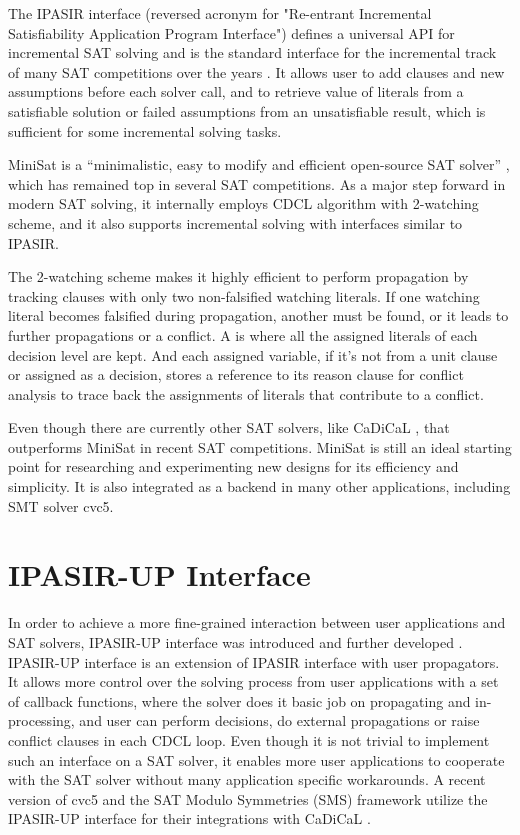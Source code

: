 The IPASIR interface (reversed acronym for "Re-entrant Incremental Satisfiability Application Program Interface") defines a universal API for incremental SAT solving and is the standard interface for the incremental track of many SAT competitions over the years \cite{BALYO201645}. It allows user to add clauses and new assumptions before each solver call, and to retrieve value of literals from a satisfiable solution or failed assumptions from an unsatisfiable result, which is sufficient for some incremental solving tasks.

MiniSat is a ``minimalistic, easy to modify and efficient open-source SAT solver'' \cite{10.1007/978-3-540-24605-3_37}, which has remained top in several SAT competitions. As a major step forward in modern SAT solving, it internally employs CDCL algorithm with 2-watching scheme, and it also supports incremental solving with interfaces similar to IPASIR.

The 2-watching scheme makes it highly efficient to perform propagation by tracking clauses with only two non-falsified watching literals. If one watching literal becomes falsified during propagation, another must be found, or it leads to further propagations or a conflict. A  is where all the assigned literals of each decision level are kept. And each assigned variable, if it's not from a unit clause or assigned as a decision, stores a reference to its reason clause for conflict analysis to trace back the assignments of literals that contribute to a conflict.

Even though there are currently other SAT solvers, like CaDiCaL \cite{BiereFallerFazekasFleuryFroleyks-CAV24}, that outperforms MiniSat in recent SAT competitions. MiniSat is still an ideal starting point for researching and experimenting new designs for its efficiency and simplicity. It is also integrated as a backend in many other applications, including SMT solver cvc5.

\section{IPASIR-UP Interface}

In order to achieve a more fine-grained interaction between user applications and SAT solvers, IPASIR-UP interface was introduced \cite{fazekas_et_al:LIPIcs.SAT.2023.8} and further developed \cite{FazekasNiemetzPreinerKirchwegerSzeiderBiere-JAIR24}. IPASIR-UP interface is an extension of IPASIR interface with user propagators. It allows more control over the solving process from user applications with a set of callback functions, where the solver does it basic job on propagating and in-processing, and user can perform decisions, do external propagations or raise conflict clauses in each CDCL loop. Even though it is not trivial to implement such an interface on a SAT solver, it enables more user applications to cooperate with the SAT solver without many application specific workarounds. A recent version of cvc5 and the SAT Modulo Symmetries (SMS) framework \cite{KirchwegerS24} utilize the IPASIR-UP interface for their integrations with CaDiCaL \cite{fazekas_et_al:LIPIcs.SAT.2023.8}.

